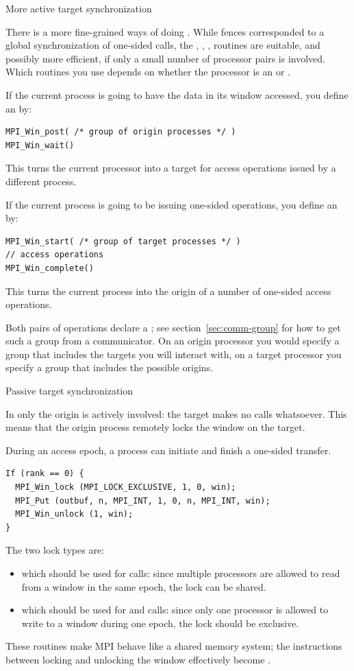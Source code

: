  {More active target synchronization}

There is a more fine-grained ways of doing 
. While fences
corresponded to a global synchronization of one-sided calls,
the ,
, ,  routines
are suitable, and possibly more efficient,
if only a small number of processor pairs is
involved.  Which routines
you use depends on whether the processor is an  or
.

If the current process is going to have the data in its window accessed,
you define an  by:
\begin{verbatim}
MPI_Win_post( /* group of origin processes */ )
MPI_Win_wait()
\end{verbatim}
This turns the current processor into a target for access operations issued
by a different process.

If the current process is going to be issuing one-sided operations,
you define an  by:
\begin{verbatim}
MPI_Win_start( /* group of target processes */ )
// access operations
MPI_Win_complete()
\end{verbatim}
This turns the current process into the origin of a number of
one-sided access operations.

Both pairs of operations declare a
; see section~\ref{sec:comm-group}
for how to get such a group from a communicator.
On an origin processor you would specify a group that includes the targets
you will interact with, on a target processor you specify a group
that includes the possible origins.

 {Passive target synchronization}

In  only the origin is
actively involved: the target makes no calls whatsoever.
This means that the origin process remotely locks the window
on the target.

During an access epoch, a process can initiate and finish a one-sided
transfer.
\begin{verbatim}
If (rank == 0) {
  MPI_Win_lock (MPI_LOCK_EXCLUSIVE, 1, 0, win);
  MPI_Put (outbuf, n, MPI_INT, 1, 0, n, MPI_INT, win);
  MPI_Win_unlock (1, win);
}
\end{verbatim}
The two lock types are:
\begin{itemize}
\item {} which should be used for 
  calls: since multiple processors are allowed to read from a window
  in the same epoch, the lock can be shared.
\item {} which should be used for
   and  calls: since only one processor is
  allowed to write to a window during one epoch, the lock should be
  exclusive.
\end{itemize}
These routines make MPI behave like a shared memory system; the
instructions between locking and unlocking the window effectively
become .

